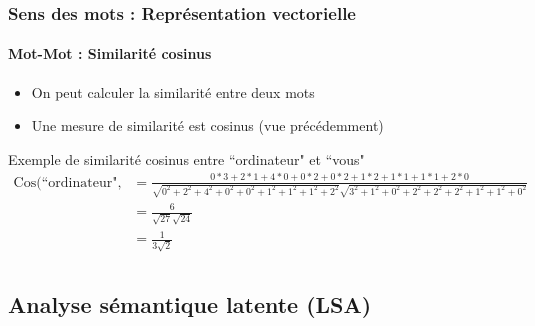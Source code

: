 \documentclass[xcolor=table]{beamer}
\begin{document}
\begin{frame}
\frametitle{Sens des mots : Représentation vectorielle}
\framesubtitle{Mot-Mot : Similarité cosinus}

\begin{itemize}
	\item On peut calculer la similarité entre deux mots
	\item Une mesure de similarité est cosinus (vue précédemment)
\end{itemize}

\begin{exampleblock}{Exemple de similarité cosinus entre ``ordinateur" et ``vous"}
	\fontsize{6}{16}\selectfont\bfseries\boldmath
	\begin{align*}
	\text{Cos(``ordinateur", ``vous")} & = \frac{0*3+2*1+4*0+0*2+0*2+1*2+1*1+1*1+2*0}{\sqrt{0^2+2^2+4^2+0^2+0^2+1^2+1^2+1^2+2^2} \sqrt{3^2+1^2+0^2+2^2+2^2+2^2+1^2+1^2+0^2}}\\
	& = \frac{6}{\sqrt{27}\sqrt{24}}\\
	& = \frac{1}{3\sqrt{2}}\\
	\end{align*}
\end{exampleblock}



\end{frame}

\subsection{Analyse sémantique latente (LSA)}
\end{document}
